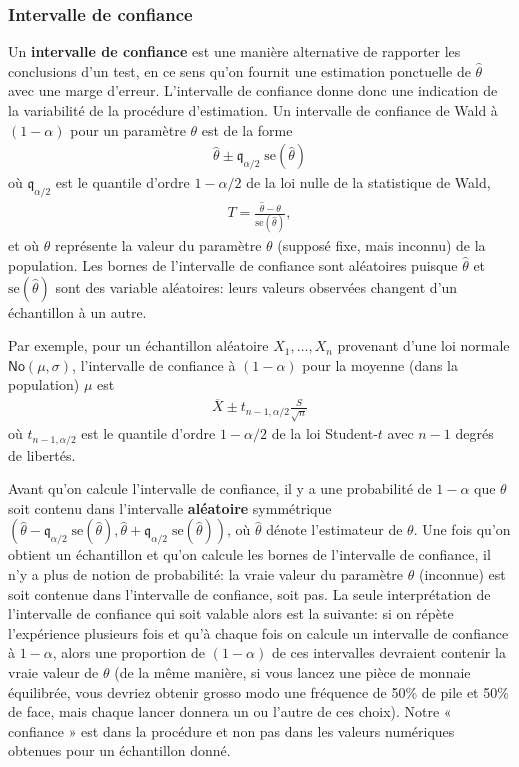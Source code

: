 \documentclass[
  11pt,
  letterpaper,
]{article}
\theoremstyle{definition}
\theoremstyle{definition}
\theoremstyle{definition}
\theoremstyle{remark}
\begin{document}
\hypertarget{intervalle-de-confiance}{%
\subsubsection{Intervalle de confiance}\label{intervalle-de-confiance}}

Un \textbf{intervalle de confiance} est une manière alternative de rapporter les conclusions d'un test, en ce sens qu'on fournit une estimation ponctuelle de \(\hat{\theta}\) avec une marge d'erreur. L'intervalle de confiance donne donc une indication de la variabilité de la procédure d'estimation. Un intervalle de confiance de Wald à \((1-\alpha)\) pour un paramètre \(\theta\) est de la forme
\begin{align*}
\widehat{\theta} \pm \mathfrak{q}_{\alpha/2} \; \mathrm{se}(\widehat{\theta})
\end{align*}
où \(\mathfrak{q}_{\alpha/2}\) est le quantile d'ordre \(1-\alpha/2\) de la loi nulle de la statistique de Wald,
\begin{align*}
T =\frac{\widehat{\theta}-\theta}{\mathrm{se}(\widehat{\theta})},
\end{align*}
et où \(\theta\) représente la valeur du paramètre \(\theta\) (supposé fixe, mais inconnu) de la population. Les bornes de l'intervalle de confiance sont aléatoires puisque \(\widehat{\theta}\) et \(\mathrm{se}(\widehat{\theta})\) sont des variable aléatoires: leurs valeurs observées changent d'un échantillon à un autre.

Par exemple, pour un échantillon aléatoire \(X_1, \ldots, X_n\) provenant d'une loi normale \(\mathsf{No}(\mu, \sigma)\), l'intervalle de confiance à \((1-\alpha)\) pour la moyenne (dans la population) \(\mu\) est
\begin{align*}
\overline{X} \pm t_{n-1, \alpha/2} \frac{S}{\sqrt{n}}
\end{align*}
où \(t_{n-1, \alpha/2}\) est le quantile d'ordre \(1-\alpha/2\) de la loi Student-\(t\) avec \(n-1\) degrés de libertés.

Avant qu'on calcule l'intervalle de confiance, il y a une probabilité de \(1-\alpha\) que \(\theta\) soit contenu dans l'intervalle \textbf{aléatoire} symmétrique \((\widehat{\theta} - \mathfrak{q}_{\alpha/2} \; \mathrm{se}(\widehat{\theta}), \widehat{\theta} + \mathfrak{q}_{\alpha/2} \; \mathrm{se}(\widehat{\theta}))\), où \(\widehat{\theta}\) dénote l'estimateur de \(\theta\). Une fois qu'on obtient un échantillon et qu'on calcule les bornes de l'intervalle de confiance, il n'y a plus de notion de probabilité: la vraie valeur du paramètre \(\theta\) (inconnue) est soit contenue dans l'intervalle de confiance, soit pas. La seule interprétation de l'intervalle de confiance qui soit valable alors est la suivante: si on répète l'expérience plusieurs fois et qu'à chaque fois on calcule un intervalle de confiance à \(1-\alpha\), alors une proportion de \((1-\alpha)\) de ces intervalles devraient contenir la vraie valeur de \(\theta\) (de la même manière, si vous lancez une pièce de monnaie équilibrée, vous devriez obtenir grosso modo une fréquence de 50\% de pile et 50\% de face, mais chaque lancer donnera un ou l'autre de ces choix). Notre « confiance » est dans la procédure et non pas dans les valeurs numériques obtenues pour un échantillon donné.
\end{document}
